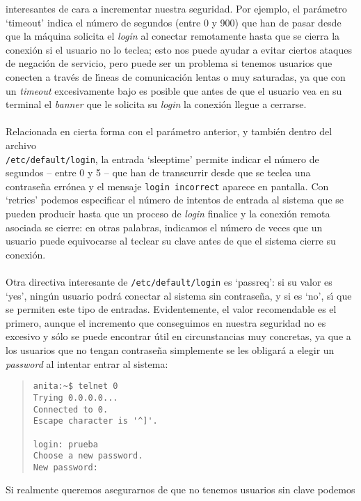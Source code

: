interesantes de cara a incrementar nuestra seguridad. Por ejemplo, el 
par\'ametro {\sc `timeout'} indica el n\'umero de segundos (entre 0 y 900) que
han de pasar desde que la m\'aquina solicita el {\it login} al conectar 
remotamente hasta que se cierra la conexi\'on si el usuario no lo teclea; esto
nos puede ayudar a evitar ciertos ataques de negaci\'on de servicio, pero puede
ser un problema si tenemos usuarios que conecten a trav\'es de l\'{\i}neas de
comunicaci\'on lentas o muy saturadas, ya que con un {\it timeout} 
excesivamente bajo es posible que antes de que el usuario vea en su terminal
el {\it banner} que le solicita su {\it login} la conexi\'on llegue a 
cerrarse.\\
\\Relacionada en cierta forma con el par\'ametro anterior, y tambi\'en dentro 
del archivo {\tt \\/etc/default/login}, la entrada {\sc `sleeptime'} permite
indicar el n\'umero de segundos -- entre 0 y 5 -- que han de transcurrir desde
que se teclea una contrase\~na err\'onea y el mensaje {\tt login incorrect}
aparece en pantalla. Con {\sc `retries'} podemos especificar el n\'umero de
intentos de entrada al sistema que se pueden producir hasta que un proceso de 
{\it login} finalice y la conexi\'on remota asociada se cierre: en otras 
palabras, indicamos el n\'umero de veces que un usuario puede equivocarse al
teclear su clave antes de que el sistema cierre su conexi\'on.\\
\\Otra directiva interesante de {\tt /etc/default/login} es {\sc `passreq'}: si
su valor es {\sc `yes'}, ning\'un usuario podr\'a conectar al sistema sin 
contrase\~na, y si es {\sc `no'}, s\'{\i} que se permiten este tipo de entradas.
Evidentemente, el valor recomendable es el primero, aunque el incremento que 
conseguimos en nuestra seguridad no es excesivo y s\'olo se puede encontrar
\'util en circunstancias muy concretas, ya que a los usuarios que no tengan
contrase\~na simplemente se les obligar\'a a elegir un {\it password} al 
intentar entrar al sistema:
\begin{quote}
\begin{verbatim}
anita:~$ telnet 0
Trying 0.0.0.0...
Connected to 0.
Escape character is '^]'.

login: prueba
Choose a new password.
New password: 
\end{verbatim}
\end{quote}
Si realmente queremos asegurarnos de que no tenemos usuarios sin clave podemos
